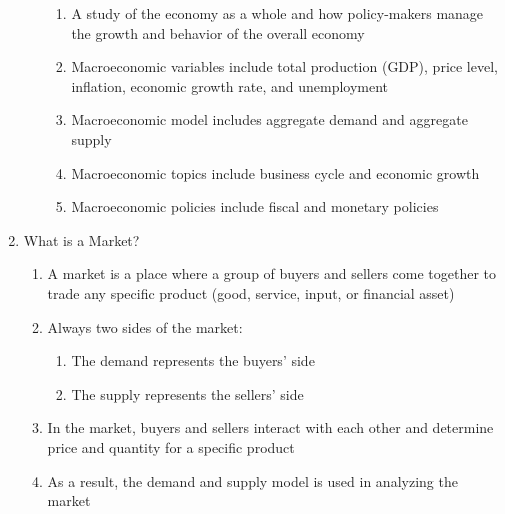 \documentclass[12pt]{article}
\begin{document}
\begin{enumerate}
\begin{enumerate}
            \begin{enumerate}

              \item A study of the economy as a whole and how policy-makers manage the growth and behavior of the overall economy

              \item Macroeconomic variables include total production (GDP), price level, inflation, economic growth rate, and unemployment

              \item Macroeconomic model includes aggregate demand and aggregate supply

              \item Macroeconomic topics include business cycle and economic growth

              \item Macroeconomic policies include fiscal and monetary policies

            \end{enumerate}

        \end{enumerate}

      \item What is a Market?

        \begin{enumerate}

          \item A market is a place where a group of buyers and sellers come together to trade any specific product (good, service, input, or financial asset)

          \item Always two sides of the market:

            \begin{enumerate}

              \item The demand represents the buyers' side

              \item The supply represents the sellers' side

            \end{enumerate}

          \item In the market, buyers and sellers interact with each other and determine price and quantity for a specific product

          \item As a result, the demand and supply model is used in analyzing the market


\end{enumerate}
\end{enumerate}
\end{document}
